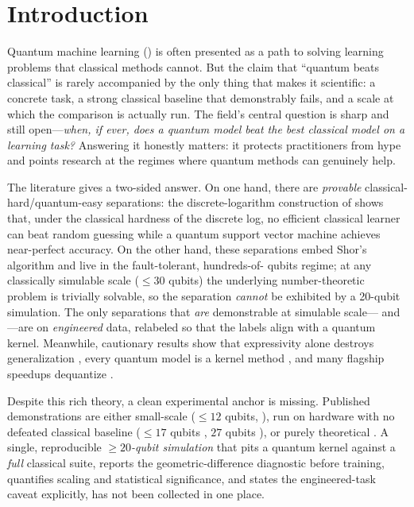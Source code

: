 \section{Introduction}
\label{sec:intro}

Quantum machine learning (\qml) is often presented as a path to solving learning
problems that classical methods cannot. But the claim that ``quantum beats
classical'' is rarely accompanied by the only thing that makes it scientific: a
concrete task, a strong classical baseline that demonstrably fails, and a scale
at which the comparison is actually run. The field's central question is sharp
and still open---\emph{when, if ever, does a quantum model beat the best
classical model on a learning task?} Answering it honestly matters: it protects
practitioners from hype and points research at the regimes where quantum methods
can genuinely help.

The literature gives a two-sided answer. On one hand, there are \emph{provable}
classical-hard/quantum-easy separations: the discrete-logarithm construction of
\citet{liu2021rigorous} shows that, under the classical hardness of the discrete
log, no efficient classical learner can beat random guessing while a quantum
support vector machine achieves near-perfect accuracy. On the other hand, these
separations embed Shor's algorithm and live in the fault-tolerant, hundreds-of-
qubits regime; at any classically simulable scale ($\le 30$ qubits) the
underlying number-theoretic problem is trivially solvable, so the separation
\emph{cannot} be exhibited by a 20-qubit simulation. The only separations that
\emph{are} demonstrable at simulable scale---\citet{huang2021power} and
\citet{jerbi2023beyond}---are on \emph{engineered} data, relabeled so that the
labels align with a quantum kernel. Meanwhile, cautionary results show that
expressivity alone destroys generalization \citep{kubler2021inductive}, every
quantum model is a kernel method \citep{schuld2021models}, and many flagship
speedups dequantize \citep{tang2019quantum}.

 Despite this rich theory, a clean experimental anchor is
missing. Published demonstrations are either small-scale ($\le 12$ qubits,
\eg \citealp{kubler2021inductive,jerbi2023beyond}), run on hardware with no
defeated classical baseline ($\le 17$ qubits \citep{peters2021machine}, $27$
qubits \citep{glick2021covariant}), or purely theoretical
\citep{liu2021rigorous,schuld2021models}. A single, reproducible \emph{$\ge
20$-qubit simulation} that pits a quantum kernel against a \emph{full} classical
suite, reports the geometric-difference diagnostic \gdiff{} before training,
quantifies scaling and statistical significance, and states the engineered-task
caveat explicitly, has not been collected in one place.

